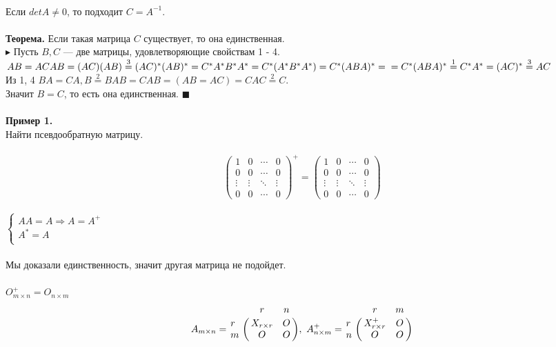 \documentclass[12pt]{article}
\theoremstyle{definition}
\numberwithin{equation}{section}
\begin{document}
\\ 
Если $detA \neq 0$, то подходит $C=A^{-1}$.\\
\\
\textbf{Теорема.}
Если такая матрица $C$ существует, то она единственная.\\
$\blacktriangleright$ Пусть $B, C$ --- две матрицы, удовлетворяющие свойствам 1 - 4.\\
$AB=ACAB=(AC)(AB)\overset{3}{=}(AC)^*(AB)^*=C^*A^*B^*A^*=C^*(A^*B^*A^*)=C^*(ABA)^*=\\ =C^*(ABA)^*\overset{1}{=}C^*A^*=(AC)^*\overset{3}{=}AC$\\
Из 1, 4 $BA=CA, B\overset{2}{=}BAB=CAB=(AB=AC)=CAC\overset{2}{=}C$.\\
Значит $B=C$, то есть она единственная. $\blacksquare$\\ \\
\noindent \textbf{Пример 1.}\\
Найти псевдообратную матрицу.\\ \\
\[\begin{pmatrix}
1 & 0 & \cdots & 0 \\
0 & 0 & \cdots & 0 \\         
\vdots & \vdots & \ddots & \vdots \\
0 & 0 & \cdots & 0
\end{pmatrix}^+ = \begin{pmatrix}
1 & 0 & \cdots & 0 \\
0 & 0 & \cdots & 0 \\         
\vdots & \vdots & \ddots & \vdots \\
0 & 0 & \cdots & 0
\end{pmatrix}\]\\
$
\left\{ 
\begin{array}{ll}  
    AA=A \Rightarrow A=A^+\\
    A^*=A\\
\end{array}   
\right.
$\\ \\
\noindent Мы доказали единственность, значит другая матрица не подойдет.\\ \\
$O_{m \times n}^+ = O_{n \times m}$\\
\[ A_{m \times n}=\bordermatrix{
&r  & n \cr
r & X_{r \times r} & O \cr 
m & O & O \cr } , ~ A_{n \times m}^+=\bordermatrix{
&r  & m \cr
r & X_{r \times r}^+ & O \cr
n & O & O \cr }\]\\
\end{document}
